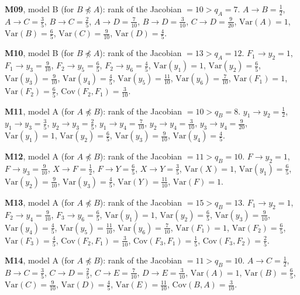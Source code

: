 \documentclass[10pt,a4paper]{article}
\newcommand{\nnest}{\not\preceq}
\begin{document}
{\noindent\textbf{M09}, model B (for $B\nnest A$): rank of the Jacobian $=10>q_A=7$. {\footnotesize $A\to B=\tfrac{1}{2}$, $A\to C=\tfrac{3}{5}$, $B\to C=\tfrac{2}{5}$, $A\to D=\tfrac{7}{10}$, $B\to D=\tfrac{3}{10}$, $C\to D=\tfrac{9}{20}$, $\mathrm{Var}(A)=1$, $\mathrm{Var}(B)=\tfrac{6}{5}$, $\mathrm{Var}(C)=\tfrac{9}{10}$, $\mathrm{Var}(D)=\tfrac{4}{5}$.}\par\smallskip
\noindent\textbf{M10}, model B (for $B\nnest A$): rank of the Jacobian $=13>q_A=12$. {\footnotesize $F_{1}\to y_{2}=1$, $F_{1}\to y_{3}=\tfrac{9}{10}$, $F_{2}\to y_{5}=\tfrac{6}{5}$, $F_{2}\to y_{6}=\tfrac{4}{5}$, $\mathrm{Var}(y_{1})=1$, $\mathrm{Var}(y_{2})=\tfrac{6}{5}$, $\mathrm{Var}(y_{3})=\tfrac{9}{10}$, $\mathrm{Var}(y_{4})=\tfrac{4}{5}$, $\mathrm{Var}(y_{5})=\tfrac{11}{10}$, $\mathrm{Var}(y_{6})=\tfrac{7}{10}$, $\mathrm{Var}(F_{1})=1$, $\mathrm{Var}(F_{2})=\tfrac{6}{5}$, $\mathrm{Cov}(F_{2},F_{1})=\tfrac{3}{10}$.}\par\smallskip
\noindent\textbf{M11}, model A (for $A\nnest B$): rank of the Jacobian $=10>q_B=8$. {\footnotesize $y_{1}\to y_{2}=\tfrac{1}{2}$, $y_{1}\to y_{3}=\tfrac{3}{5}$, $y_{2}\to y_{3}=\tfrac{2}{5}$, $y_{1}\to y_{4}=\tfrac{7}{10}$, $y_{2}\to y_{4}=\tfrac{3}{10}$, $y_{3}\to y_{4}=\tfrac{9}{20}$, $\mathrm{Var}(y_{1})=1$, $\mathrm{Var}(y_{2})=\tfrac{6}{5}$, $\mathrm{Var}(y_{3})=\tfrac{9}{10}$, $\mathrm{Var}(y_{4})=\tfrac{4}{5}$.}\par\smallskip
\noindent\textbf{M12}, model A (for $A\nnest B$): rank of the Jacobian $=11>q_B=10$. {\footnotesize $F\to y_{2}=1$, $F\to y_{3}=\tfrac{9}{10}$, $X\to F=\tfrac{1}{2}$, $F\to Y=\tfrac{6}{5}$, $X\to Y=\tfrac{3}{5}$, $\mathrm{Var}(X)=1$, $\mathrm{Var}(y_{1})=\tfrac{6}{5}$, $\mathrm{Var}(y_{2})=\tfrac{9}{10}$, $\mathrm{Var}(y_{3})=\tfrac{4}{5}$, $\mathrm{Var}(Y)=\tfrac{11}{10}$, $\mathrm{Var}(F)=1$.}\par\smallskip
\noindent\textbf{M13}, model A (for $A\nnest B$): rank of the Jacobian $=15>q_B=13$. {\footnotesize $F_{1}\to y_{2}=1$, $F_{2}\to y_{4}=\tfrac{9}{10}$, $F_{3}\to y_{6}=\tfrac{6}{5}$, $\mathrm{Var}(y_{1})=1$, $\mathrm{Var}(y_{2})=\tfrac{6}{5}$, $\mathrm{Var}(y_{3})=\tfrac{9}{10}$, $\mathrm{Var}(y_{4})=\tfrac{4}{5}$, $\mathrm{Var}(y_{5})=\tfrac{11}{10}$, $\mathrm{Var}(y_{6})=\tfrac{7}{10}$, $\mathrm{Var}(F_{1})=1$, $\mathrm{Var}(F_{2})=\tfrac{6}{5}$, $\mathrm{Var}(F_{3})=\tfrac{4}{5}$, $\mathrm{Cov}(F_{2},F_{1})=\tfrac{3}{10}$, $\mathrm{Cov}(F_{3},F_{1})=\tfrac{1}{5}$, $\mathrm{Cov}(F_{3},F_{2})=\tfrac{2}{5}$.}\par\smallskip
\noindent\textbf{M14}, model A (for $A\nnest B$): rank of the Jacobian $=11>q_B=10$. {\footnotesize $A\to C=\tfrac{1}{2}$, $B\to C=\tfrac{3}{5}$, $C\to D=\tfrac{2}{5}$, $C\to E=\tfrac{7}{10}$, $D\to E=\tfrac{3}{10}$, $\mathrm{Var}(A)=1$, $\mathrm{Var}(B)=\tfrac{6}{5}$, $\mathrm{Var}(C)=\tfrac{9}{10}$, $\mathrm{Var}(D)=\tfrac{4}{5}$, $\mathrm{Var}(E)=\tfrac{11}{10}$, $\mathrm{Cov}(B,A)=\tfrac{3}{10}$.}\par\smallskip
}
\end{document}
